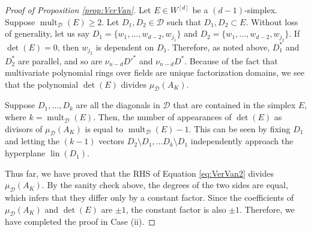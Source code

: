 \documentclass{article}
\DeclareMathOperator{\lin}{lin}
\DeclareMathOperator{\mult}{mult}
\begin{document}
\begin{proof}[Proof of Proposition \ref{prop:VerVan}]
    Let $E \in W^{[d]}$ be a $(d-1)$-simplex. Suppose $\mult_\mathcal{D} (E) \geq 2$. Let $D_1, D_2 \in \mathcal{D}$ such that $D_1, D_2 \subset E$. Without loss of generality, let us say $D_1 = \{w_1, ..., w_{d-2}, w_{j_1}\}$ and $D_2 = \{w_1, ..., w_{d-2}, w_{j_2}\}$. If $\det(E) = 0$, then $w_{j_2}$ is dependent on $D_1$. Therefore, as noted above, $D_1^*$ and $D_2^*$ are parallel, and so are $\nu_{n-d} D'^*$ and $\nu_{n-d} D^*$. Because of the fact that multivariate polynomial rings over fields are unique factorization domains, we see that the polynomial $\det(E)$ divides $\mu_\mathcal{D} (A_K)$. 
    
    Suppose $D_1, \dots, D_k$ are all the diagonals in $\mathcal{D}$ that are contained in the simplex $E$, where $k = \mult_\mathcal{D} (E)$. Then, the number of appearances of $\det(E)$ as divisors of $\mu_\mathcal{D} (A_K)$ is equal to $\mult_\mathcal{D} (E) - 1$. This can be seen by fixing $D_1$ and letting the $(k-1)$ vectors $D_2 \setminus D_1, \dots D_k \setminus D_1$ independently approach the hyperplane $\lin(D_1)$.

	Thus far, we have proved that the RHS of Equation \ref{eq:VerVan2} divides $\mu_\mathcal{D}(A_K)$. By the sanity check above, the degrees of the two sides are equal, which infers that they differ only by a constant factor. Since the coefficients of $\mu_\mathcal{D}(A_K)$ and $\det(E)$ are $\pm 1$, the constant factor is also $\pm 1$. Therefore, we have completed the proof in Case (ii).
    
\end{proof}
\end{document}
